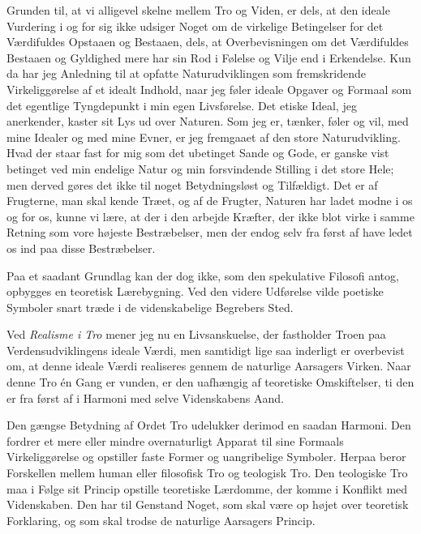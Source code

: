 \documentclass[12pt,a4paper]{article}
\newcommand{\opage}[1]{\marginnote{\footnotesize\textit{[#1]}}}
\begin{document}
Grunden til, at vi alligevel skelne mellem Tro og Viden, er dels, at
den ideale Vurdering i og for sig ikke udsiger
\opage{11}Noget om de virkelige
Betingelser for det Værdifuldes Opstaaen og Bestaaen, dels, at
Overbevisningen om det Værdifuldes Bestaaen og Gyldighed mere har sin
Rod i Følelse og Vilje end i Erkendelse. Kun da har jeg Anledning til
at opfatte Naturudviklingen som fremskridende Virkeliggørelse af et
idealt Indhold, naar jeg føler ideale Opgaver og Formaal som det
egentlige Tyngdepunkt i min egen Livsførelse. Det etiske Ideal, jeg
anerkender, kaster sit Lys ud over Naturen. Som jeg er, tænker, føler
og vil, med mine Idealer og med mine Evner, er jeg fremgaaet af den
store Naturudvikling. Hvad der staar fast for mig som det ubetinget
Sande og Gode, er ganske vist betinget ved min endelige Natur og min
forsvindende Stilling i det store Hele; men derved gøres det ikke til
noget Betydningsløst og Tilfældigt. Det er af Frugterne, man skal kende
Træet, og af de Frugter, Naturen har ladet modne i os og for os, kunne
vi lære, at der i den arbejde Kræfter, der ikke blot virke i samme
Retning som vore højeste Bestræbelser, men der endog selv fra først af
have ledet os ind paa disse Bestræbelser.

Paa et saadant Grundlag kan der dog ikke, som den spekulative Filosofi
antog, opbygges en teoretisk Lærebygning. Ved den videre Udførelse vilde
poetiske Symboler snart træde i de videnskabelige Begrebers Sted.

Ved \emph{Realisme i Tro} mener jeg nu en Livsanskuelse, der fastholder Troen
paa Verdensudviklingens ideale Værdi, men samtidigt lige saa inderligt
er overbevist om, at denne ideale Værdi realiseres gennem de naturlige
Aarsagers Virken. Naar denne Tro én Gang er vunden, er den uafhængig af
teoretiske Omskiftelser, ti den er fra først af i Harmoni med selve
Videnskabens Aand.

Den gængse Betydning af Ordet Tro udelukker derimod en saadan Harmoni.
Den fordrer et mere eller mindre overnaturligt Apparat til sine Formaals
Virkeliggørelse og opstiller faste Former og uangribelige Symboler.
Herpaa beror Forskellen mellem human eller filosofisk Tro og teologisk
Tro. Den teologiske Tro maa i Følge sit Princip opstille teoretiske
Lærdomme, der komme i Konflikt med Videnskaben. Den har til Genstand
Noget, som skal være op%
\opage{12}højet over teoretisk Forklaring, og som skal
trodse de naturlige Aarsagers Princip.
\end{document}
